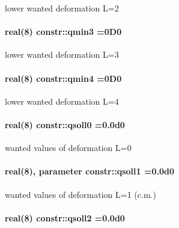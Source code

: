 lower wanted deformation L=2 

\paragraph[{\texorpdfstring{qmin3}{qmin3}}]{\setlength{\rightskip}{0pt plus 5cm}real(8) constr\+::qmin3 =0\+D0}\hypertarget{namespaceconstr_aea591e60298cd3b40646923a1d91885f}{}\label{namespaceconstr_aea591e60298cd3b40646923a1d91885f}


lower wanted deformation L=3 

\paragraph[{\texorpdfstring{qmin4}{qmin4}}]{\setlength{\rightskip}{0pt plus 5cm}real(8) constr\+::qmin4 =0\+D0}\hypertarget{namespaceconstr_a0e331fe923c308ed2f8d34f3124d7c6e}{}\label{namespaceconstr_a0e331fe923c308ed2f8d34f3124d7c6e}


lower wanted deformation L=4 

\paragraph[{\texorpdfstring{qsoll0}{qsoll0}}]{\setlength{\rightskip}{0pt plus 5cm}real(8) constr\+::qsoll0 =0.\+0d0}\hypertarget{namespaceconstr_abfbf6522e18eaf9397748a01e84e7894}{}\label{namespaceconstr_abfbf6522e18eaf9397748a01e84e7894}


wanted values of deformation L=0 

\paragraph[{\texorpdfstring{qsoll1}{qsoll1}}]{\setlength{\rightskip}{0pt plus 5cm}real(8), parameter constr\+::qsoll1 =0.\+0d0}\hypertarget{namespaceconstr_ab8723fa9ecb2a5b18496b199e586f3a8}{}\label{namespaceconstr_ab8723fa9ecb2a5b18496b199e586f3a8}


wanted values of deformation L=1 (c.\+m.) 

\paragraph[{\texorpdfstring{qsoll2}{qsoll2}}]{\setlength{\rightskip}{0pt plus 5cm}real(8) constr\+::qsoll2 =0.\+0d0}\hypertarget{namespaceconstr_a58b40724ec16e519451b798d3d7ab8b6}{}\label{namespaceconstr_a58b40724ec16e519451b798d3d7ab8b6}


